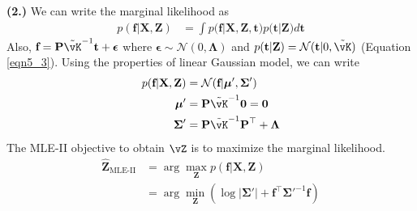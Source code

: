 \documentclass[a4paper,11pt]{article}
\begin{document}
\begin{pmisolution}
\noindent \textbf{(2.)}
We can write the marginal likelihood as
\begin{align}
        p(\textbf{f}|\textbf{X}, \textbf{Z}) &= \int p(\textbf{f}|\textbf{X}, \textbf{Z}, \textbf{t})p(\textbf{t}|\textbf{Z)} d\textbf{t}
        \nonumber
\end{align}
Also, $\textbf{f} = \textbf{P}\Tilde{\vK}^{-1}\textbf{t} + \boldsymbol{\epsilon}$ where $\boldsymbol{\epsilon} \sim \mathcal{N}(0, \boldsymbol{\Lambda})$ and $ p(\textbf{t}|\textbf{Z}) = \mathcal{N}(\textbf{t}|0, \Tilde{\vK})$ (Equation \ref{eqn5_3}). Using the properties of linear Gaussian model, we can write
\begin{align}
        p(\textbf{f}|\textbf{X}, \textbf{Z}) &= \mathcal{N}(\textbf{f} | \boldsymbol{\mu}', \boldsymbol{\Sigma}')
        \nonumber
        \\ \boldsymbol{\mu}' &= \textbf{P}\Tilde{\vK}^{-1}\mathbf{0} = \textbf{0}
        \nonumber
        \\ \boldsymbol{\Sigma}' &= \textbf{P}\Tilde{\vK}^{-1}\textbf{P}^\top + \boldsymbol{\Lambda}
        \nonumber
\end{align}
The MLE-II objective to obtain $\vZ$ is to maximize the marginal likelihood. 
\begin{align}
    \hat{\textbf{Z}}_{\text{MLE-II}} &= \arg \max_{\textbf{Z}}p(\textbf{f}|\textbf{X}, \textbf{Z})
    \nonumber
    \\&= \arg \min_{\textbf{Z}}(\log{|\boldsymbol{\Sigma'}|} + \textbf{f}^\top\boldsymbol{\Sigma'}^{-1}\textbf{f})
    \nonumber
\end{align}

\end{pmisolution}
\end{document}
